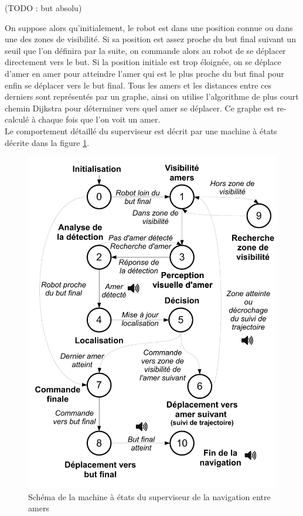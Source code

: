 \documentclass[10pt,a4paper]{article}
\begin{document}
(TODO : but absolu)

On suppose alors qu'initialement, le robot est dans une position connue ou dans une des zones de visibilité. Si sa position est assez proche du but final suivant un seuil que l'on définira par la suite, on commande alors au robot de se déplacer directement vers le but. Si la position initiale est trop éloignée, on se déplace d'amer en amer pour atteindre l'amer qui est le plus proche du but final pour enfin se déplacer vers le but final. Tous les amers et les distances entre ces derniers sont représentés par un graphe, ainsi on utilise l'algorithme de plus court chemin Dijkstra pour déterminer vers quel amer se déplacer. Ce graphe est re-calculé à chaque fois que l'on voit un amer.\\

Le comportement détaillé du superviseur est décrit par une machine à états décrite dans la figure \ref{HLC_MEF}.



\begin{figure}[!h]
\centering\includegraphics[scale=0.5]{figures/HLC_MEF.pdf}
\caption{Schéma de la machine à états du superviseur de la navigation entre amers}
\label{HLC_MEF}
\end{figure}
\end{document}
